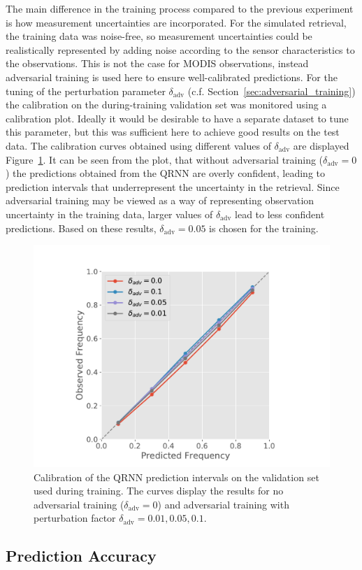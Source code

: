 \documentclass[journal abbreviation, manuscript]{copernicus}
\begin{document}
The main difference in the training process compared to the previous experiment
is how measurement uncertainties are incorporated. For the simulated retrieval,
the training data was noise-free, so measurement uncertainties could be
realistically represented by adding noise according to the sensor
characteristics to the observations. This is not the case for MODIS
observations, instead adversarial training is used here to ensure
well-calibrated predictions. For the tuning of the perturbation
parameter $\delta_{\text{adv}}$ (c.f. Section~\ref{sec:adversarial_training})
the calibration on the during-training validation set was monitored using a
calibration plot. Ideally it would be desirable to have a separate dataset to
tune this parameter, but this was sufficient here to achieve good results on the
test data. The calibration curves obtained using different values of
$\delta_\text{adv}$ are displayed Figure~\ref{fig:validation_calibration}. It
can be seen from the plot, that without adversarial training ($\delta_\text{adv}
= 0$) the predictions obtained from the QRNN are overly confident, leading to
prediction intervals that underrepresent the uncertainty in the retrieval. Since
adversarial training may be viewed as a way of representing observation
uncertainty in the training data, larger values of $\delta_\text{adv}$ lead to
less confident predictions. Based on these results, $\delta_\text{adv} = 0.05$
is chosen for the training.

  \begin{figure}[hbpt!]
    \centering
    \includegraphics[width = 0.4\linewidth]{../plots/validation_calibration}
    \caption{Calibration of the QRNN prediction intervals on the validation set
      used during training. The curves display the results for no adversarial training
      ($\delta_\text{adv} = 0$) and adversarial training with perturbation
      factor $\delta_\text{adv} = 0.01, 0.05, 0.1$.}
    \label{fig:validation_calibration}
  \end{figure}


\subsection{Prediction Accuracy}
\end{document}

